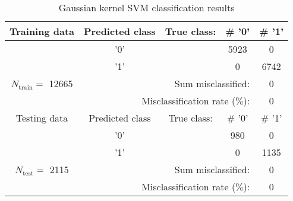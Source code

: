 \documentclass[a4paper,11pt]{article}
\begin{document}
\begin{table}[H]
\caption{Gaussian kernel SVM classification results}
\centering
\begin{tabular}{c | c | c c c}
\hline\hline
Training data & Predicted class & True class: & \# '0' & \# '1' \\ [0.5ex] %
\hline
& '0' & & 5923 & 0 \\
& '1' & & 0 & 6742\\ 
\hline 
$N_\text{train} = $ 12665  & \multicolumn{3}{r}{Sum misclassified: } & 0 \\ [.5ex]
\hline 
 & \multicolumn{3}{r}{Misclassification rate (\%):} & 0 \\ [.5ex]
\hline\hline
%
Testing data & Predicted class & True class: & \# '0' & \# '1' \\ [0.5ex] %
\hline
& '0' & & 980 & 0 \\
& '1' & & 0 & 1135 \\ 
\hline 
$N_\text{test} = $ 2115  & \multicolumn{3}{r}{Sum misclassified:} & 0  \\ [.5ex]
\hline 
 & \multicolumn{3}{r}{Misclassification rate (\%): } &0 \\ [.5ex]
\hline\hline
%
\end{tabular}
\label{table:kernelsvmtable}
\end{table}
%
\end{document}

